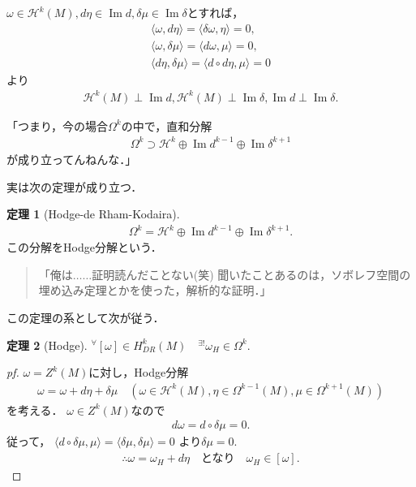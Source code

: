 \documentclass[12pt, a4paper, dvipdfmx, draft]{jsarticle}
\theoremstyle{definition}
\newtheorem*{Theorem*}{定理}
\newcommand{\mcal}{\mathcal}
\newcommand{\im}{\mathop{\mathrm{Im}}\nolimits}
\theoremstyle{mystyle}
\numberwithin{equation}{section} %
\def\inner<#1>{\langle #1 \rangle}
\begin{document}
$\omega\in\mcal{H}^{k}(M), d\eta\in\im d, \delta\mu\in\im\delta$とすれば，
\begin{align*}
    \inner<\omega,d\eta>=\inner<\delta\omega,\eta>=0,\\
    \inner<\omega,\delta\mu>=\inner<d\omega,\mu>=0,\\
    \inner<d\eta,\delta\mu>=\inner<d\circ d\eta,\mu>=0
\end{align*}
より
\begin{align*}
    \mcal{H}^{k}(M)\perp\im d, \mcal{H}^{k}(M)\perp\im \delta, \im d\perp\im\delta.
\end{align*}

「つまり，今の場合$\Omega^{k}$の中で，直和分解
\begin{align*}
    \Omega^{k}\supset\mcal{H}^{k}\oplus\im d^{k-1}\oplus\im\delta^{k+1}
\end{align*}
が成り立ってんねんな．」

実は次の定理が成り立つ．

\begin{Theorem*}[Hodge-de Rham-Kodaira]
\begin{align*}
    \Omega^{k}=\mcal{H}^{k}\oplus\im d^{k-1}\oplus\im\delta^{k+1}.
\end{align*}
この分解をHodge分解という．
\end{Theorem*}
\begin{quotation}
    
「俺は$\ldots\ldots$証明読んだことない(笑)
聞いたことあるのは，ソボレフ空間の埋め込み定理とかを使った，解析的な証明．」

\end{quotation}
この定理の系として次が従う．
\begin{Theorem*}[Hodge]
    ${}^{\forall}[\omega]\in H_{DR}^k(M)\quad {}^{\exists!}\omega_{H}\in\Omega^{k}$.
\end{Theorem*}

\begin{proof}[pf]
    $\omega=Z^{k}(M)$に対し，Hodge分解
    \begin{align*}
        \omega=\omega + d\eta + \delta\mu \quad (\omega\in\mcal{H}^{k}(M), \eta\in\Omega^{k-1}(M), \mu\in\Omega^{k+1}(M))
    \end{align*}
    を考える．
    $\omega\in Z^{k}(M)$なので
    \begin{align*}
        d\omega = d\circ\delta\mu=0. 
    \end{align*}
    従って，
    $\inner<d\circ\delta\mu,\mu>=\inner<\delta\mu,\delta\mu>=0$
    より$\delta\mu=0$. \\
    \begin{align*}
        \therefore \omega = \omega_{H}+d\eta\quad\text{となり}\quad\omega_{H}\in[\omega].
    \end{align*}
\end{proof}
\end{document}
